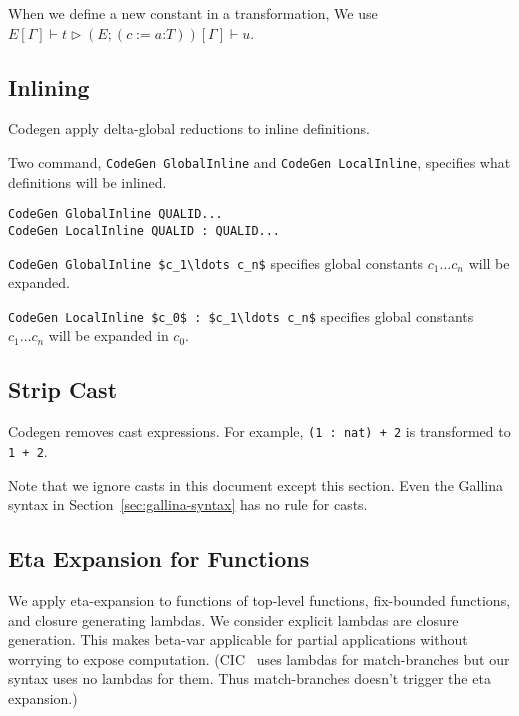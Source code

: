\documentclass[a4paper,fleqn]{article}
\def\gallina{\textrm{Gallina}}
\def\codegen{\textrm{Codegen}}
\newcommand{\glodef}[3]{(#1:=#2\mathord{:}#3)}
\newcommand{\secref}[1]{Section~\ref{#1}}
\newcommand{\reltri}{\mathrel{\triangleright}}
\begin{document}
When we define a new constant in a transformation,
We use $E[\Gamma] \vdash t \reltri (E;\glodef{c}{a}{T})[\Gamma] \vdash u$.

\subsection{Inlining}\label{sec:inlining}

\codegen{} apply delta-global reductions to inline definitions.

Two command, \lstinline!CodeGen GlobalInline! and \lstinline!CodeGen LocalInline!, specifies
what definitions will be inlined.
\begin{lstlisting}
CodeGen GlobalInline QUALID...
CodeGen LocalInline QUALID : QUALID...
\end{lstlisting}

\lstinline[mathescape=true]!CodeGen GlobalInline $c_1\ldots c_n$! specifies
global constants $c_1\ldots c_n$ will be expanded.

\lstinline[mathescape=true]!CodeGen LocalInline $c_0$ : $c_1\ldots c_n$! specifies
global constants $c_1\ldots c_n$ will be expanded in $c_0$.

\subsection{Strip Cast}\label{sec:strip-cast}

\codegen{} removes cast expressions.
For example, \lstinline!(1 : nat) + 2! is transformed to \lstinline!1 + 2!.

Note that we ignore casts in this document except this section.
Even the \gallina{} syntax in \secref{sec:gallina-syntax} has no rule for casts.

\subsection{Eta Expansion for Functions}\label{sec:eta-expand-funcs}
We apply eta-expansion to functions of top-level functions, fix-bounded functions, and closure generating lambdas.
We consider explicit lambdas are closure generation.
This makes beta-var applicable for partial applications without worrying to expose computation.
(CIC~\cite{coqrefman8.12.0} uses lambdas for match-branches but our syntax uses no lambdas for them.
Thus match-branches doesn't trigger the eta expansion.)
\end{document}
